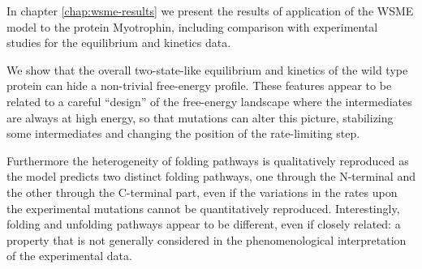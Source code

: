In chapter \ref{chap:wsme-results} we present the results of application of the WSME model
to the protein Myotrophin, including comparison with experimental
studies for the equilibrium and kinetics data.

We show that the overall two-state-like equilibrium and kinetics of the wild
type protein can hide a non-trivial free-energy profile. 
These features appear to be related to a careful 
``design'' of the free-energy landscape where the intermediates are always at
high energy, so that mutations can alter this picture, 
stabilizing some intermediates and changing the position of the rate-limiting step. 

Furthermore the heterogeneity of folding pathways is qualitatively reproduced as
the model predicts two distinct folding  pathways, one through the N-terminal and the other through the 
C-terminal part, even if the variations in the rates 
upon the experimental mutations cannot be quantitatively reproduced. 
Interestingly, folding and unfolding pathways appear to be different, 
even if closely related: a property that is not generally considered 
in the phenomenological interpretation of the experimental data.
